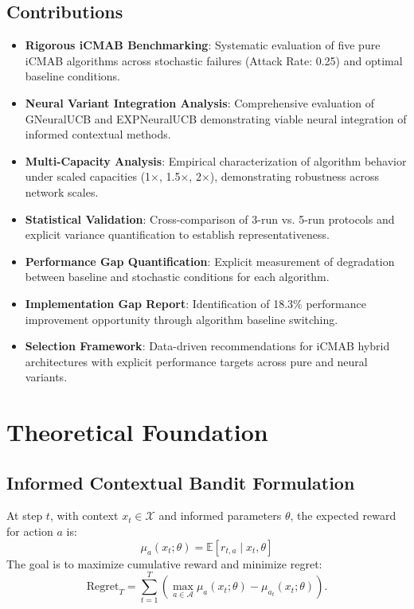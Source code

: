 \documentclass[12pt,a4paper]{article}
\begin{document}
\subsection{Contributions}
\begin{itemize}
\item \textbf{Rigorous iCMAB Benchmarking}: Systematic evaluation of five pure iCMAB algorithms across stochastic failures (Attack Rate: 0.25) and optimal baseline conditions.
\item \textbf{Neural Variant Integration Analysis}: Comprehensive evaluation of GNeuralUCB and EXPNeuralUCB demonstrating viable neural integration of informed contextual methods.
\item \textbf{Multi-Capacity Analysis}: Empirical characterization of algorithm behavior under scaled capacities (1$\times$, 1.5$\times$, 2$\times$), demonstrating robustness across network scales.
\item \textbf{Statistical Validation}: Cross-comparison of 3-run vs. 5-run protocols and explicit variance quantification to establish representativeness.
\item \textbf{Performance Gap Quantification}: Explicit measurement of degradation between baseline and stochastic conditions for each algorithm.
\item \textbf{Implementation Gap Report}: Identification of 18.3\% performance improvement opportunity through algorithm baseline switching.
\item \textbf{Selection Framework}: Data-driven recommendations for iCMAB hybrid architectures with explicit performance targets across pure and neural variants.
\end{itemize}

\section{Theoretical Foundation}

\subsection{Informed Contextual Bandit Formulation}
At step $t$, with context $x_t \in \mathcal{X}$ and informed parameters $\theta$, the expected reward for action $a$ is:
\[
\mu_a(x_t; \theta) = \mathbb{E}[r_{t,a} \mid x_t, \theta]
\]
The goal is to maximize cumulative reward and minimize regret:
\[
\mathrm{Regret}_T = \sum_{t=1}^{T}\left(\max_{a \in \mathcal{A}} \mu_a(x_t;\theta) - \mu_{a_t}(x_t;\theta)\right).
\]
\end{document}
